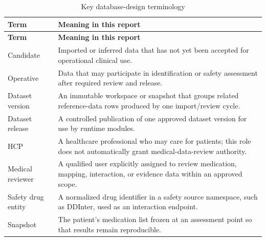 \begin{longtable}{L{3.4cm}L{11.4cm}}
\caption{Key database-design terminology}\label{tab:terminology}\\
\toprule
\textbf{Term} & \textbf{Meaning in this report}\\
\midrule
\endfirsthead
\toprule
\textbf{Term} & \textbf{Meaning in this report}\\
\midrule
\endhead
Candidate & Imported or inferred data that has not yet been accepted for operational clinical use.\\
Operative & Data that may participate in identification or safety assessment after required review and release.\\
Dataset version & An immutable workspace or snapshot that groups related reference-data rows produced by one import/review cycle.\\
Dataset release & A controlled publication of one approved dataset version for use by runtime modules.\\
HCP & A healthcare professional who may care for patients; this role does not automatically grant medical-data-review authority.\\
Medical reviewer & A qualified user explicitly assigned to review medication, mapping, interaction, or evidence data within an approved scope.\\
Safety drug entity & A normalized drug identifier in a safety source namespace, such as DDInter, used as an interaction endpoint.\\
Snapshot & The patient's medication list frozen at an assessment point so that results remain reproducible.\\
\bottomrule
\end{longtable}


